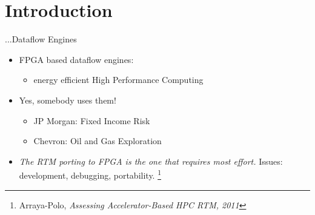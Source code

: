 \section{Introduction}

\begin{frame}{...Dataflow Engines}
\begin{itemize}
  \item FPGA based dataflow engines:
\begin{itemize}
  \item energy efficient High Performance Computing
\end{itemize}
\hspace{1cm}
\pause
  \item Yes, somebody uses them!
    \begin{itemize}
    \item JP Morgan: Fixed Income Risk
    \item Chevron: Oil and Gas Exploration
    \end{itemize}
\hspace{1cm}
\pause
\item \emph{The RTM porting to FPGA is the one that requires most
    effort.} Issues: development, debugging, portability. \footnote{Arraya-Polo, \emph{Assessing Accelerator-Based
HPC RTM, 2011}
}
\end{itemize}
\end{frame}


